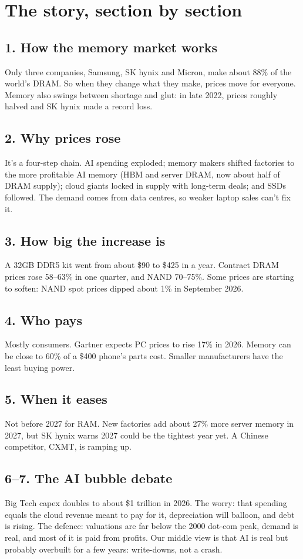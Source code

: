 \documentclass[11pt]{article}
\begin{document}
\section*{The story, section by section}

\subsection*{1. How the memory market works}
Only three companies, Samsung, SK hynix and Micron, make about 88\% of the world's DRAM. So when they change what they make, prices move for everyone. Memory also swings between shortage and glut: in late 2022, prices roughly halved and SK hynix made a record loss.

\subsection*{2. Why prices rose}
It's a four-step chain. AI spending exploded; memory makers shifted factories to the more profitable AI memory (HBM and server DRAM, now about half of DRAM supply); cloud giants locked in supply with long-term deals; and SSDs followed. The demand comes from data centres, so weaker laptop sales can't fix it.

\subsection*{3. How big the increase is}
A 32GB DDR5 kit went from about \$90 to \$425 in a year. Contract DRAM prices rose 58--63\% in one quarter, and NAND 70--75\%. Some prices are starting to soften: NAND spot prices dipped about 1\% in September 2026.

\subsection*{4. Who pays}
Mostly consumers. Gartner expects PC prices to rise 17\% in 2026. Memory can be close to 60\% of a \$400 phone's parts cost. Smaller manufacturers have the least buying power.

\subsection*{5. When it eases}
Not before 2027 for RAM. New factories add about 27\% more server memory in 2027, but SK hynix warns 2027 could be the tightest year yet. A Chinese competitor, CXMT, is ramping up.

\subsection*{6--7. The AI bubble debate}
Big Tech capex doubles to about \$1 trillion in 2026. The worry: that spending equals the cloud revenue meant to pay for it, depreciation will balloon, and debt is rising. The defence: valuations are far below the 2000 dot-com peak, demand is real, and most of it is paid from profits. Our middle view is that AI is real but probably overbuilt for a few years: write-downs, not a crash.
\end{document}
